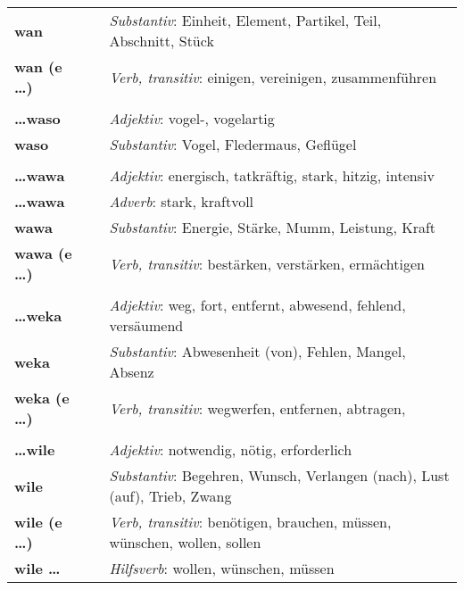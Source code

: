 \begin{supertabular}{p{2,5cm}|ll}
\textbf{wan} && \textit{Substantiv}: Einheit, Element, Partikel, Teil, Abschnitt, Stück \\ 
\textbf{wan (e \dots)} && \textit{Verb, transitiv}: einigen, vereinigen, zusammenführen \\ 
 && \\ %
\textbf{\dots waso} && \textit{Adjektiv}: vogel-, vogelartig \\ 
\textbf{waso} && \textit{Substantiv}: Vogel, Fledermaus, Geflügel \\ 
 && \\ %
\textbf{\dots wawa} && \textit{Adjektiv}: energisch, tatkräftig, stark, hitzig, intensiv \\ 
\textbf{\dots wawa} && \textit{Adverb}: stark, kraftvoll \\ 
\textbf{wawa} && \textit{Substantiv}: Energie, Stärke, Mumm, Leistung, Kraft \\ 
\textbf{wawa (e \dots)} && \textit{Verb, transitiv}: bestärken, verstärken, ermächtigen \\ 
 && \\ %
\textbf{\dots weka} && \textit{Adjektiv}: weg, fort, entfernt, abwesend, fehlend, versäumend \\ 
\textbf{weka} && \textit{Substantiv}: Abwesenheit (von), Fehlen, Mangel, Absenz \\ 
\textbf{weka (e \dots)} && \textit{Verb, transitiv}: wegwerfen, entfernen, abtragen,  \\ 
 && \\ %
\textbf{\dots wile} && \textit{Adjektiv}: notwendig,  nötig, erforderlich \\ 
\textbf{wile} && \textit{Substantiv}: Begehren, Wunsch, Verlangen (nach), Lust (auf), Trieb, Zwang \\ 
\textbf{wile (e \dots)} && \textit{Verb, transitiv}: benötigen, brauchen, müssen, wünschen, wollen, sollen \\ 
\textbf{wile \dots} && \textit{Hilfsverb}: wollen, wünschen, müssen \\ 
\end{supertabular} \\
%
